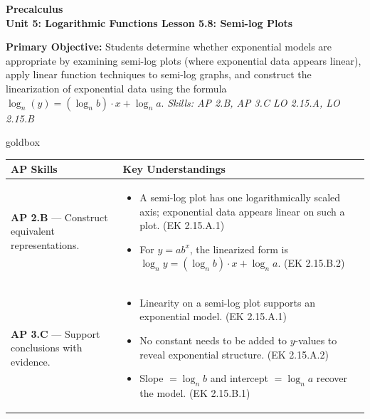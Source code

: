 \documentclass[10pt]{article}
\newcommand{\CourseName}{Precalculus}
\newcommand{\UnitNumberName}{Unit 5: Logarithmic Functions \quad}
\newcommand{\LessonNumberName}{Lesson 5.8: Semi-log Plots}
\begin{document}
\begin{center}
    {\Large\bfseries \CourseName \\
    {\small\bfseries \UnitNumberName \LessonNumberName}}
\end{center}

\begin{tcolorbox}[colback=sky, colframe=navy, boxrule=0.9pt, arc=2mm,
    left=2mm, right=2mm, top=1.5mm, bottom=1.5mm]
    \textbf{Primary Objective:} Students determine whether exponential models are appropriate
    by examining semi-log plots (where exponential data appears linear), apply linear function
    techniques to semi-log graphs, and construct the linearization of exponential data using
    the formula $\log_n(y) = (\log_n b)\cdot x + \log_n a$.
    \hfill\textit{\small Skills: AP 2.B, AP 3.C \quad LO 2.15.A, LO 2.15.B}
\end{tcolorbox}

\renewcommand{\arraystretch}{1.6}
\begin{skillbox}{goldbox}
\begin{tabularx}{\linewidth}{@{}X X@{}}
\textbf{AP Skills} &
\textbf{Key Understandings} \\
\midrule
\textbf{AP 2.B} --- Construct equivalent representations. &
\begin{itemize}[leftmargin=1.2em,itemsep=2pt,topsep=0pt]
  \item A semi-log plot has one logarithmically scaled axis; exponential data appears linear
        on such a plot. (EK 2.15.A.1)
  \item For $y = ab^x$, the linearized form is
        $\log_n y = (\log_n b)\cdot x + \log_n a$. (EK 2.15.B.2)
\end{itemize} \\
\textbf{AP 3.C} --- Support conclusions with evidence. &
\begin{itemize}[leftmargin=1.2em,itemsep=2pt,topsep=0pt]
  \item Linearity on a semi-log plot supports an exponential model. (EK 2.15.A.1)
  \item No constant needs to be added to $y$-values to reveal exponential structure.
        (EK 2.15.A.2)
  \item Slope $= \log_n b$ and intercept $= \log_n a$ recover the model. (EK 2.15.B.1)
\end{itemize} \\
\end{tabularx}
\end{skillbox}
\end{document}

